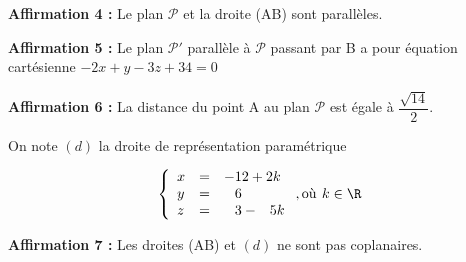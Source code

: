 \textbf{Affirmation 4 :} \og Le plan $\mathcal{P}$ et la droite (AB) sont parallèles.\fg

\textbf{Affirmation 5 :} \og Le plan $\mathcal{P}'$ parallèle à $\mathcal{P}$ passant par B a pour équation cartésienne $-2x + y - 3z + 34 = 0$ \fg

\textbf{Affirmation 6 :} \og La distance du point A au plan $\mathcal{P}$ est égale à $\dfrac{\sqrt{14}}{2}$.\fg

\smallskip

On note $(d)$ la droite de représentation paramétrique

\[\left\{\begin{array}{l c l}
x &=&-12 + 2k\\
y &=&\phantom{-}6\\
z &=&\phantom{-}3 - \phantom{-}5k
\end{array}\right., \text{où}\, \:k \in \R\]

\textbf{Affirmation 7 :} \og Les droites (AB) et $(d)$ ne sont pas coplanaires. \fg

\bigskip

